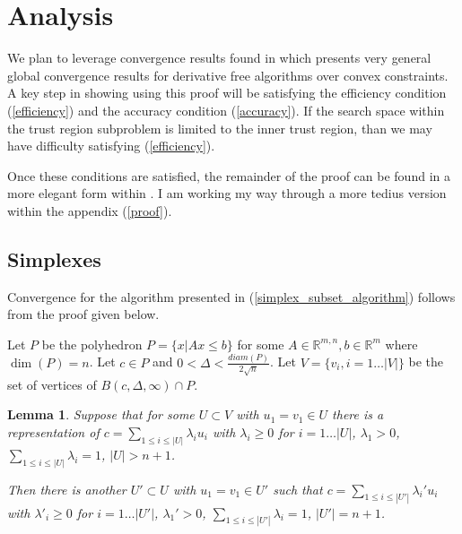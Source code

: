 \documentclass{article}
\newtheorem{lemma}[theorem]{Lemma}
\theoremstyle{case}
\let\oldref\ref
\renewcommand{\ref}[1]{(\oldref{#1})}
\begin{document}
\section{Analysis}

We plan to leverage convergence results found in \cite{Conejo:2013:GCT:2620806.2621814} which presents very general global convergence results for derivative free algorithms over convex constraints.
A key step in showing using this proof will be satisfying the efficiency condition \ref{efficiency} and the accuracy condition \ref{accuracy}.
If the search space within the trust region subproblem is limited to the inner trust region, than we may have difficulty satisfying \ref{efficiency}.


Once these conditions are satisfied, the remainder of the proof can be found in a more elegant form within \cite{Conejo:2013:GCT:2620806.2621814}.
I am working my way through a more tedius version within the appendix \ref{proof}.

\color{red}
\subsection{Simplexes}

Convergence for the algorithm presented in \ref{simplex_subset_algorithm} follows from the proof given below.

\label{simplexes_exist}


Let $P$ be the polyhedron $P=\{x | Ax \le b\}$ for some $A \in \mathbb R^{m,n}, b \in \mathbb R^{m}$ where $\dim(P) = n$.
Let $c \in P$ and $0 < \Delta < \frac {diam(P)}{2\sqrt{n}}$.
Let $V = \{v_i, i=1\ldots |V|\}$ be the set of vertices of $B(c, \Delta, \infty) \cap P$.

\begin{lemma}
\label{positive_carried}
Suppose that for some $U \subset V$ with $u_1 = v_1 \in U$ there is a representation of 
$c=\sum_{1\le i \le |U|} \lambda_i u_i$ with $\lambda_i \ge 0$ for $i=1\ldots |U|$, $\lambda_1 > 0$, $\sum_{1\le i\le |U|} \lambda_i = 1$, $|U| > n+1$.

Then there is another $U' \subset U$ with $u_1 = v_1 \in U'$ such that
$c=\sum_{1\le i \le |U'|} \lambda_i' u_i$ with $\lambda'_i \ge 0$ for $i=1\ldots |U'|$, $\lambda_1' > 0$, $\sum_{1\le i\le |U'|} \lambda_i = 1$, $|U'| = n+1$.
\end{lemma}
\end{document}
